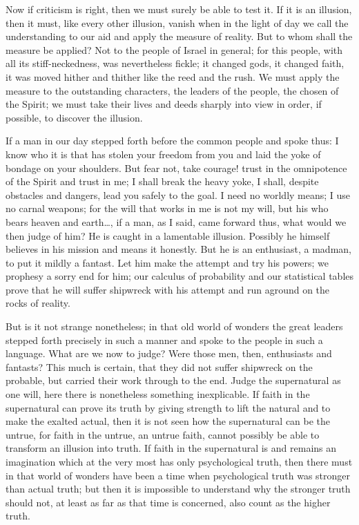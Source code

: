 \documentclass[12pt,a4paper,openany]{book}
\newcommand{\opage}[1]{\marginnote{\footnotesize\textit{[#1]}}}
\begin{document}
Now if criticism is right, then we must surely be able to
test it. If it is an illusion, then it must, like
every other illusion, vanish when in the light of day
we call the understanding to our aid and apply the measure
of reality. But to whom shall the measure
be applied? Not to the people of Israel in general; for
this people, with all its stiff-neckedness, was nevertheless fickle;
it changed gods, it changed faith, it was moved hither
and thither like the reed and the rush. We must apply the measure
to the outstanding characters, the leaders of the people,
the chosen of the Spirit; we must take their lives and deeds
sharply into view in order, if possible, to discover
the illusion.

\setcounter{footnote}{0}%
\opage{22}If a man in our day stepped forth before the
common people and spoke thus: I know who it is that
has stolen your freedom from you and laid the yoke of bondage
on your shoulders. But fear not, take courage!
trust in the omnipotence of the Spirit and trust in me; I shall
break the heavy yoke, I shall, despite obstacles and
dangers, lead you safely to the goal. I need no
worldly means; I use no carnal weapons; for
the will that works in me is not my will, but
his who bears heaven and earth\dots{}, if a man,
as I said, came forward thus, what would we then judge
of him? He is caught in a lamentable illusion.
Possibly he himself believes in his mission and means
it honestly. But he is an enthusiast, a madman,
to put it mildly a fantast. Let him make the attempt and
try his powers; we prophesy a sorry end for him;
our calculus of probability and our statistical tables
prove that he will suffer shipwreck with his attempt and
run aground on the rocks of reality.

But is it not strange nonetheless; in that old
world of wonders the great leaders stepped forth precisely
in such a manner and spoke to the people in such a
language. What are we now to judge? Were those
men, then, enthusiasts and fantasts? This much is certain,
that they did not suffer shipwreck on the probable, but
carried their work through to the end. Judge the supernatural
as one will, here there is nonetheless something inexplicable.
If faith in the supernatural can prove its truth
by giving strength to lift the natural
and to make the exalted actual, then it is not seen how
the supernatural can be the untrue, for faith
in the untrue, an untrue faith, cannot possibly be able to
\setcounter{footnote}{0}%
\opage{23}transform an illusion into truth. If faith in
the supernatural is and remains an imagination which at
the very most has only psychological truth, then there must
in that world of wonders have been a time when
psychological truth was stronger than actual
truth; but then it is impossible to understand why the
stronger truth should not, at least as far as that time is concerned,
also count as the higher truth.
\end{document}

